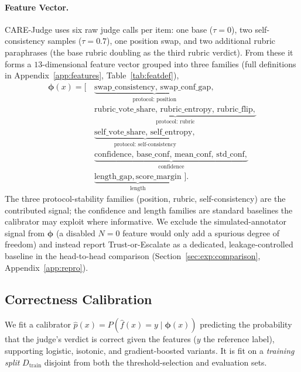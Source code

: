 \paragraph{Feature Vector.}
CARE-Judge uses six raw judge calls per item: one base ($\tau{=}0$), two self-consistency samples ($\tau{=}0.7$), one position swap, and two additional rubric paraphrases (the base rubric doubling as the third rubric verdict). From these it forms a $13$-dimensional feature vector grouped into three families (full definitions in Appendix~\ref{app:features}, Table~\ref{tab:featdef}),
\begin{equation}
\begin{aligned}
    \boldsymbol{\phi}(x) = \big[\,
    &\underbrace{\text{swap\_consistency},\, \text{swap\_conf\_gap},}_{\text{protocol: position}}\\[-1pt]
    &\underbrace{\text{rubric\_vote\_share},\, \text{rubric\_entropy},\, \text{rubric\_flip},}_{\text{protocol: rubric}}\\[-1pt]
    &\underbrace{\text{self\_vote\_share},\, \text{self\_entropy},}_{\text{protocol: self-consistency}}\\[-1pt]
    &\underbrace{\text{confidence},\, \text{base\_conf},\, \text{mean\_conf},\, \text{std\_conf},}_{\text{confidence}}\\[-1pt]
    &\underbrace{\text{length\_gap},\, \text{score\_margin}}_{\text{length}}\,\big].
\end{aligned}
    \label{eq:features}
\end{equation}
The three protocol-stability families (position, rubric, self-consistency) are the contributed signal; the confidence and length families are standard baselines the calibrator may exploit where informative. We exclude the simulated-annotator signal from $\boldsymbol\phi$ (a disabled $N{=}0$ feature would only add a spurious degree of freedom) and instead report Trust-or-Escalate as a dedicated, leakage-controlled baseline in the head-to-head comparison (Section~\ref{sec:exp:comparison}, Appendix~\ref{app:repro}).

\subsection{Correctness Calibration}
\label{sec:method:calibration}

We fit a calibrator $\hat{p}(x) = P(\hat{f}(x){=}y \mid \boldsymbol{\phi}(x))$ predicting the probability that the judge's verdict is correct given the features ($y$ the reference label), supporting logistic, isotonic, and gradient-boosted variants. It is fit on a \emph{training split} $D_{\text{train}}$ disjoint from both the threshold-selection and evaluation sets.

